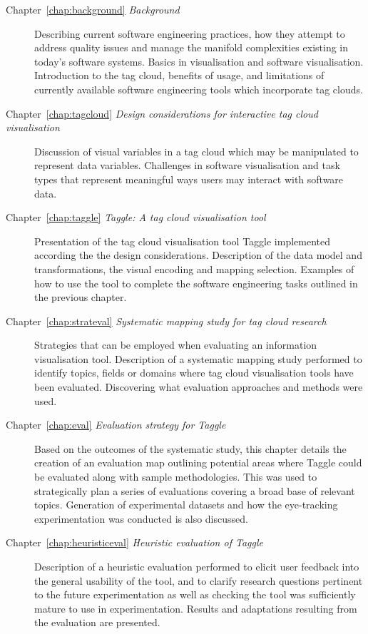 \begin{description}
	\item[Chapter~\ref{chap:background} \emph{Background}] Describing current software engineering practices, how they attempt to address quality issues and manage the manifold complexities existing in today's software systems. Basics in visualisation and software visualisation. Introduction to the tag cloud, benefits of usage, and limitations of currently available software engineering tools which incorporate tag clouds. 
	\item[Chapter~\ref{chap:tagcloud} \emph{Design considerations for interactive tag cloud visualisation}] Discussion of visual variables in a tag cloud which may be manipulated to represent data variables. Challenges in software visualisation and task types that represent meaningful ways users may interact with software data.
	\item[Chapter~\ref{chap:taggle} \emph{Taggle: A tag cloud visualisation tool}] Presentation of the tag cloud visualisation tool Taggle implemented according the the design considerations. Description of the data model and transformations, the visual encoding and mapping selection. Examples of how to use the tool to complete the software engineering tasks outlined in the previous chapter.
	\item[Chapter~\ref{chap:strateval} \emph{Systematic mapping study for tag cloud research}] Strategies that can be employed when evaluating an information visualisation tool. Description of a systematic mapping study performed to identify topics, fields or domains where tag cloud visualisation tools have been evaluated. Discovering what evaluation approaches and methods were used. 
	\item[Chapter~\ref{chap:eval} \emph{Evaluation strategy for Taggle}] Based on the outcomes of the systematic study, this chapter details the creation of an evaluation map outlining potential areas where Taggle could be evaluated along with sample methodologies. This was used to strategically plan a series of evaluations covering a broad base of relevant topics. Generation of experimental datasets and how the eye-tracking experimentation was conducted is also discussed.
	\item[Chapter~\ref{chap:heuristiceval} \emph{Heuristic evaluation of Taggle}] Description of a heuristic evaluation performed to elicit user feedback into the general usability of the tool, and to clarify research questions pertinent to the future experimentation as well as checking the tool was sufficiently mature to use in experimentation. Results and adaptations resulting from the evaluation are presented.

\end{description}
